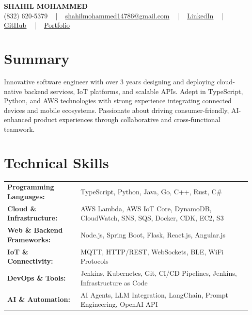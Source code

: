 \documentclass[letterpaper,11pt]{article}
\begin{document}
\begin{center}
    {\fontsize{14pt}{12pt}\selectfont \textbf{\MakeUppercase{Shahil Mohammed}}}\\ \vspace{2pt}
    \fontsize{10pt}{12pt}\selectfont (832) 620-5379 ~ | ~ \href{mailto:shahilmohammed14786@gmail.com}{shahilmohammed14786@gmail.com} ~ | ~  
    \href{https://www.linkedin.com/in/shahil-mohammed-9652931a1/}{\color{blue}\underline{LinkedIn}}  ~ | ~ 
    \href{https://github.com/freakbeast14}{\color{blue}\underline{GitHub}} ~ | ~ 
    \href{https://shahil-mohammed.netlify.app/}{\color{blue}\underline{Portfolio}}
    \vspace{-8pt}
\end{center}

\section{Summary}
\fontsize{9pt}{10pt}\selectfont
Innovative software engineer with over 3 years designing and deploying cloud-native backend services, IoT platforms, and scalable APIs. Adept in TypeScript, Python, and AWS technologies with strong experience integrating connected devices and mobile ecosystems. Passionate about driving consumer-friendly, AI-enhanced product experiences through collaborative and cross-functional teamwork.
 \vspace{-5pt}
 
\section{Technical Skills}
        \vspace{-14pt}
        \begin{table}[h]
            \fontsize{9pt}{10pt}\selectfont
            \begin{tabular}{p{0.3\linewidth} p{0.7\linewidth}}
                \textbf{Programming Languages:} & TypeScript, Python, Java, Go, C++, Rust, C\# \\
                \textbf{Cloud \& Infrastructure:} & AWS Lambda, AWS IoT Core, DynamoDB, CloudWatch, SNS, SQS, Docker, CDK, EC2, S3 \\
                \textbf{Web \& Backend Frameworks:} & Node.js, Spring Boot, Flask, React.js, Angular.js \\
                \textbf{IoT \& Connectivity:} & MQTT, HTTP/REST, WebSockets, BLE, WiFi Protocols \\
                \textbf{DevOps \& Tools:} & Jenkins, Kubernetes, Git, CI/CD Pipelines, Jenkins, Infrastructure as Code \\
                \textbf{AI \& Automation:} & AI Agents, LLM Integration, LangChain, Prompt Engineering, OpenAI API \\
            \end{tabular}
        \end{table}
 \vspace{-15pt}
 
\end{document}
